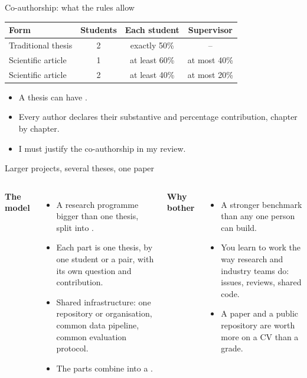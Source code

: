 \documentclass[aspectratio=169,11pt,t]{beamer}
\begin{document}
\begin{frame}{Co-authorship: what the rules allow}
  \begin{center}
  \begin{tabular}{@{}lccc@{}}
    \toprule
    \textbf{Form} & \textbf{Students} & \textbf{Each student} & \textbf{Supervisor} \\
    \midrule
    Traditional thesis   & 2 & exactly 50\%     & -- \\
    Scientific article   & 1 & at least 60\%    & at most 40\% \\
    Scientific article   & 2 & at least 40\%    & at most 20\% \\
    \bottomrule
  \end{tabular}
  \end{center}

  \medskip
  \begin{itemize}
    \item A thesis can have .
    \item Every author declares their substantive and percentage contribution, chapter by chapter.
    \item I must justify the co-authorship in my review.
  \end{itemize}
\end{frame}

\begin{frame}{Larger projects, several theses, one paper}
  \begin{columns}[T,onlytextwidth]
    \textbf{The model}
    \begin{itemize}
      \item A research programme bigger than one thesis, split into .
      \item Each part is one thesis, by one student or a pair, with its own question and contribution.
      \item Shared infrastructure: one repository or organisation, common data pipeline,
            common evaluation protocol.
      \item The parts combine into a .
    \end{itemize}
    \textbf{Why bother}
    \begin{itemize}
      \item A stronger benchmark than any one person can build.
      \item You learn to work the way research and industry teams do: issues, reviews, shared code.
      \item A paper and a public repository are worth more on a CV than a grade.
    \end{itemize}
    \medskip
  \end{columns}
\end{frame}
\end{document}
